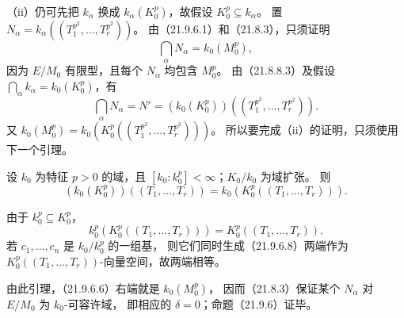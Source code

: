 （ii）仍可先把 $k_\alpha$ 换成 $k_\alpha(K_0^p)$，故假设 $K_0^p\subseteq k_\alpha$。
置 $N_\alpha=k_\alpha((T_1^{p^2},\ldots,T_r^{p^2}))$。
由（21.9.6.1）和（21.8.3），只须证明
\[
 \bigcap_\alpha N_\alpha=k_0(M_0^p),
\]
因为 $E/M_0$ 有限型，且每个 $N_\alpha$ 均包含 $M_0^p$。
由（21.8.8.3）及假设 $\bigcap_\alpha k_\alpha=k_0(K_0^p)$，有
\begin{equation}
 \bigcap_\alpha N_\alpha
 =N'=(k_0(K_0^p))((T_1^{p^2},\ldots,T_r^{p^2})).
 \tag{21.9.6.6}
\end{equation}
又 $k_0(M_0^p)=k_0(K_0^p((T_1^{p^2},\ldots,T_r^{p^2})))$。
所以要完成（ii）的证明，只须使用下一个引理。

设 $k_0$ 为特征 $p>0$ 的域，且 $[k_0:k_0^p]<\infty$；$K_0/k_0$ 为域扩张。
则
\begin{equation}
 (k_0(K_0^p))((T_1,\ldots,T_r))
 =k_0(K_0^p((T_1,\ldots,T_r))).
 \tag{21.9.6.8}
\end{equation}

\eproof
由于 $k_0^p\subseteq K_0^p$，
\[
 k_0^p(K_0^p((T_1,\ldots,T_r)))=K_0^p((T_1,\ldots,T_r)).
\]
若 $c_1,\ldots,c_n$ 是 $k_0/k_0^p$ 的一组基，
则它们同时生成（21.9.6.8）两端作为
$K_0^p((T_1,\ldots,T_r))$-向量空间，故两端相等。
\finishproof

由此引理，（21.9.6.6）右端就是 $k_0(M_0^p)$，
因而（21.8.3）保证某个 $N_\alpha$ 对 $E/M_0$ 为 $k_0$-可容许域，
即相应的 $\delta=0$；命题（21.9.6）证毕。
